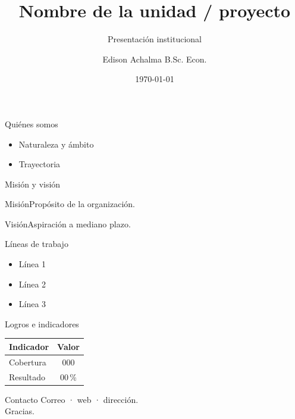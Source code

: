 \documentclass{academic-beamer}
\title{Nombre de la unidad / proyecto}
\subtitle{Presentación institucional}
\author{Edison Achalma B.Sc. Econ.}
\institute{Universidad Nacional de San Cristóbal de Huamanga}
\date{\today}
\begin{document}
\begin{frame}\titlepage\end{frame}

\begin{frame}{Quiénes somos}
\begin{itemize}\item Naturaleza y ámbito \item Trayectoria\end{itemize}
\end{frame}

\begin{frame}{Misión y visión}
\begin{block}{Misión}Propósito de la organización.\end{block}
\begin{block}{Visión}Aspiración a mediano plazo.\end{block}
\end{frame}

\begin{frame}{Líneas de trabajo}
\begin{itemize}\item Línea 1 \item Línea 2 \item Línea 3\end{itemize}
\end{frame}

\begin{frame}{Logros e indicadores}
\begin{table}\centering\begin{tabular}{lc}\toprule Indicador & Valor \\\midrule Cobertura & 000 \\ Resultado & 00\,\% \\\bottomrule\end{tabular}\end{table}
\end{frame}

\begin{frame}{Contacto}
\centering Correo · web · dirección.\\[1ex]{\large\color{acento}Gracias.}
\end{frame}
\end{document}
